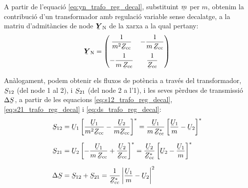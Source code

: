 A partir de l'equaci\'{o}  \eqref{eq:yn_trafo_reg_decal}, substituint
$\cmplx{m}$ per $m$, obtenim la contribuci\'{o} d'un transformador amb
regulaci\'{o} variable sense decalatge, a la matriu d'admit\`{a}ncies de
node $\mcmplx{Y}\ped{N}$ de la xarxa a la qual pertany:
\begin{equation}
   \mcmplx{Y}\ped{N} = \begin{pmatrix}
     \dfrac{1}{m^2 \cmplx{Z}\ped{cc}} & - \dfrac{1}{m \,\cmplx{Z}\ped{cc}} \\[2.5ex]
     - \dfrac{1}{m \,\cmplx{Z}\ped{cc}} & \dfrac{1}{\cmplx{Z}\ped{cc}}
   \end{pmatrix}
\end{equation}

An\`{a}logament, podem obtenir els fluxos de pot\`{e}ncia a trav\'{e}s del
transformador, $\cmplx{S}_{12}$ (del node 1 al 2), i
$\cmplx{S}_{21}$ (del node 2 a l'1), i les seves p\`{e}rdues de
transmissi\'{o}  $\Delta\cmplx{S}$, a partir de les equacions
\eqref{eq:s12_trafo_reg_decal},  \eqref{eq:s21_trafo_reg_decal} i
\eqref{eq:ds_trafo_reg_decal}:  
\begin{align}
   \cmplx{S}_{12} &= \cmplx{U}_1 \left[ \frac{\cmplx{U}_1}{m^2 \cmplx{Z}\ped{cc}} - \frac{\cmplx{U}_2}{m \cmplx{Z}\ped{cc}} \right]^* = \frac{\cmplx{U}_1}{m \,\cmplx{Z}\ped{cc}^*} \left[ \frac{\cmplx{U}_1}{m} - \cmplx{U}_2 \right]^*  \\[1.5ex]
   \cmplx{S}_{21} &= \cmplx{U}_2 \left[ - \frac{\cmplx{U}_1}{m \,\cmplx{Z}\ped{cc}} + \frac{\cmplx{U}_2} {\cmplx{Z}\ped{cc}} \right]^* = \frac{\cmplx{U}_2}{\cmplx{Z}\ped{cc}^*} \left[  \cmplx{U}_2 - \frac{\cmplx{U}_1}{m}  \right]^* \\[1.5ex]
 \Delta\cmplx{S} &= \cmplx{S}_{12} + \cmplx{S}_{21} = \frac{1}{\cmplx{Z}\ped{cc}^*}  \left|
    \frac{\cmplx{U}_1}{m} - \cmplx{U}_2 \right|^2
\end{align}


